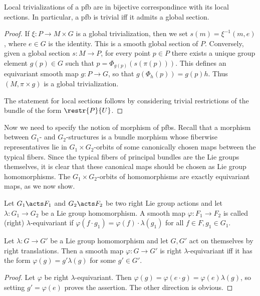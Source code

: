 \begin{prop}[{{\cite[Prop.~1.1.6]{RS2}}}]\label{prop 1.1.6 RS2}
    Local trivializations of a \gls{pfb} are in bijective correspondince with its local sections. In particular, a \gls{pfb} is trivial iff it admits a global section.
\end{prop}
\begin{proof}
    If $\xi:P\to M\times G$ is a global trivialization, then we set $s(m)=\xi^{-1}(m,e)$, where $e\in G$ is the identity. This is a smooth global section of $P$. Conversely, given a global section $s:M\to P$, for every point $p\in P$ there exists a unique group element $g(p)\in G$ such that $p=\Phi_{g(p)}(s(\pi(p)))$. This defines an equivariant smooth map $g:P\to G$, so that $g(\Phi_h(p))=g(p)h$. Thus $(M,\pi\times g)$ is a global trivialization.

    The statement for local sections follows by considering trivial restrictions of the bundle of the form $\restr{P}{U}$.
\end{proof}


Now we need to specify the notion of morphism of \glspl{pfb}. Recall that a morphism between $G_1$- and $G_2$-structures is a bundle morphism whose fiberwise representatives lie in $G_1\times G_2$-orbits of some canonically chosen maps between the typical fibers. Since the typical fibers of principal bundles are the Lie groups themselves, it is clear that these canonical maps should be chosen as Lie group homomorphisms. The $G_1\times G_2$-orbits of homomorphisms are exactly equivariant maps, as we now show. 

\begin{defn}
    Let $G_1\acts F_1$ and $G_2\acts F_2$ be two right Lie group actions and let $\lambda:G_1\to G_2$ be a Lie group homomorphism. A smooth map $\varphi:F_1\to F_2$ is called (right) $\lambda$-equivariant if $\varphi(f\cdot g_1)=\varphi(f)\cdot \lambda(g_1)$ for all $f\in F,g_1\in G_1$.
\end{defn}

\begin{prop}
    Let $\lambda:G\to G'$ be a Lie group homomorphism and let $G,G'$ act on themselves by right translations. Then a smooth map $\varphi:G\to G'$ is right $\lambda$-equivariant iff it has the form $\varphi(g)=g'\lambda(g)$ for some $g'\in G'$.
\end{prop}
\begin{proof}
    Let $\varphi$ be right $\lambda$-equivariant. Then
    $\varphi(g)=\varphi(e\cdot g)=\varphi(e)\lambda(g)$,
    so setting $g'=\varphi(e)$ proves the assertion. The other direction is obvious.
\end{proof}



